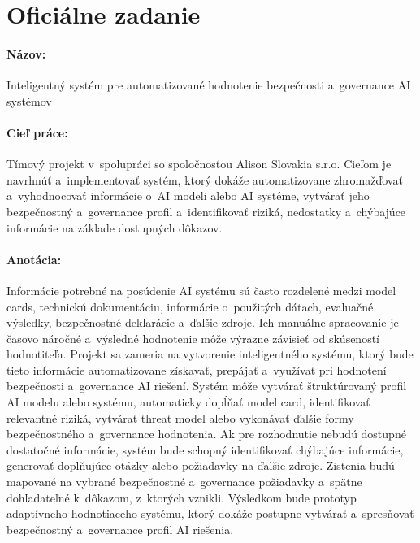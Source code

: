 \section{Oficiálne zadanie}
\label{sec:zadanie}

\paragraph{Názov:} Inteligentný systém pre automatizované hodnotenie
bezpečnosti a~governance AI systémov

\paragraph{Cieľ práce:} Tímový projekt v~spolupráci so spoločnosťou Alison
Slovakia s.r.o. Cieľom je navrhnúť a~implementovať systém, ktorý dokáže
automatizovane zhromažďovať a~vyhodnocovať informácie o~AI modeli alebo AI
systéme, vytvárať jeho bezpečnostný a~governance profil a~identifikovať
riziká, nedostatky a~chýbajúce informácie na základe dostupných dôkazov.

\paragraph{Anotácia:} Informácie potrebné na posúdenie AI systému sú často
rozdelené medzi model cards, technickú dokumentáciu, informácie o~použitých
dátach, evaluačné výsledky, bezpečnostné deklarácie a~ďalšie zdroje. Ich
manuálne spracovanie je časovo náročné a~výsledné hodnotenie môže výrazne
závisieť od skúseností hodnotiteľa. Projekt sa zameria na vytvorenie
inteligentného systému, ktorý bude tieto informácie automatizovane získavať,
prepájať a~využívať pri hodnotení bezpečnosti a~governance AI riešení. Systém
môže vytvárať štruktúrovaný profil AI modelu alebo systému, automaticky
dopĺňať model card, identifikovať relevantné riziká, vytvárať threat model
alebo vykonávať ďalšie formy bezpečnostného a~governance hodnotenia. Ak pre
rozhodnutie nebudú dostupné dostatočné informácie, systém bude schopný
identifikovať chýbajúce informácie, generovať doplňujúce otázky alebo
požiadavky na ďalšie zdroje. Zistenia budú mapované na vybrané bezpečnostné
a~governance požiadavky a~spätne dohľadateľné k~dôkazom, z~ktorých vznikli.
Výsledkom bude prototyp adaptívneho hodnotiaceho systému, ktorý dokáže
postupne vytvárať a~spresňovať bezpečnostný a~governance profil AI riešenia.

